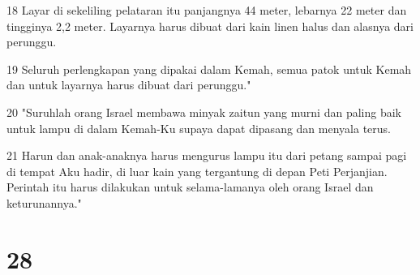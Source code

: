 \par 18 Layar di sekeliling pelataran itu panjangnya 44 meter, lebarnya 22 meter dan tingginya 2,2 meter. Layarnya harus dibuat dari kain linen halus dan alasnya dari perunggu.
\par 19 Seluruh perlengkapan yang dipakai dalam Kemah, semua patok untuk Kemah dan untuk layarnya harus dibuat dari perunggu."
\par 20 "Suruhlah orang Israel membawa minyak zaitun yang murni dan paling baik untuk lampu di dalam Kemah-Ku supaya dapat dipasang dan menyala terus.
\par 21 Harun dan anak-anaknya harus mengurus lampu itu dari petang sampai pagi di tempat Aku hadir, di luar kain yang tergantung di depan Peti Perjanjian. Perintah itu harus dilakukan untuk selama-lamanya oleh orang Israel dan keturunannya."

\chapter{28}

